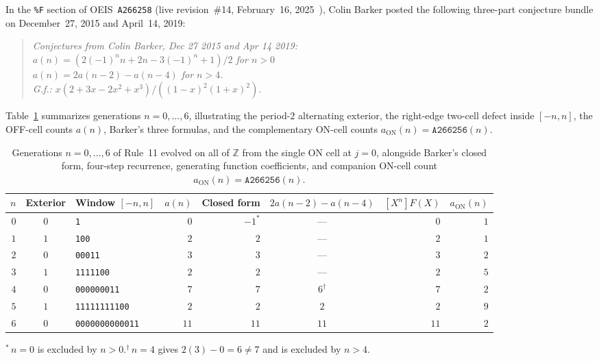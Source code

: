 \documentclass[11pt]{article}
\theoremstyle{definition}
\newcommand{\Z}{\mathbb{Z}}
\newcommand{\seq}[1]{\texttt{#1}}
\begin{document}
In the \texttt{\%F} section of OEIS~\seq{A266258} (live revision~\#14, February~16, 2025~\cite{oeis266258}), Colin Barker posted the following three-part conjecture bundle on December~27, 2015 and April~14, 2019:
\begin{quote}\itshape
Conjectures from Colin Barker, Dec 27 2015 and Apr 14 2019:\\
$a(n) = (2(-1)^n n + 2n - 3(-1)^n + 1)/2$ for $n > 0$\\
$a(n) = 2a(n - 2) - a(n - 4)$ for $n > 4$.\\
G.f.: $x(2 + 3x - 2x^2 + x^3) / ((1 - x)^2(1 + x)^2)$.
\end{quote}
Table~\ref{tab:small-n} summarizes generations $n = 0, \dots, 6$, illustrating the period-$2$ alternating exterior, the right-edge two-cell defect inside $[-n, n]$, the OFF-cell counts $a(n)$, Barker's three formulas, and the complementary ON-cell counts $a_{\mathrm{ON}}(n) = \seq{A266256}(n)$.

\begin{table}[ht]
\centering
\caption{Generations $n = 0, \dots, 6$ of Rule~11 evolved on all of $\Z$ from the single ON cell at $j = 0$, alongside Barker's closed form, four-step recurrence, generating function coefficients, and companion ON-cell count $a_{\mathrm{ON}}(n) = \seq{A266256}(n)$.}
\label{tab:small-n}
\smallskip
{\small
\begin{tabular}{@{}r c l r r c r r@{}}
\toprule
$n$ & Exterior & Window $[-n, n]$ & $a(n)$ & Closed form & $2a(n-2) - a(n-4)$ & $[X^n]F(X)$ & $a_{\mathrm{ON}}(n)$ \\
\midrule
$0$ & $0$ & \texttt{1} & $0$ & $-1^*$ & --- & $0$ & $1$ \\
$1$ & $1$ & \texttt{100} & $2$ & $2$ & --- & $2$ & $1$ \\
$2$ & $0$ & \texttt{00011} & $3$ & $3$ & --- & $3$ & $2$ \\
$3$ & $1$ & \texttt{1111100} & $2$ & $2$ & --- & $2$ & $5$ \\
$4$ & $0$ & \texttt{000000011} & $7$ & $7$ & $6^\dagger$ & $7$ & $2$ \\
$5$ & $1$ & \texttt{11111111100} & $2$ & $2$ & $2$ & $2$ & $9$ \\
$6$ & $0$ & \texttt{0000000000011} & $11$ & $11$ & $11$ & $11$ & $2$ \\
\bottomrule
\end{tabular}

\smallskip
{\footnotesize ${}^*$\,$n = 0$ is excluded by $n > 0$.\quad ${}^\dagger$\,$n = 4$ gives $2(3) - 0 = 6 \ne 7$ and is excluded by $n > 4$.}
}
\end{table}
\end{document}
